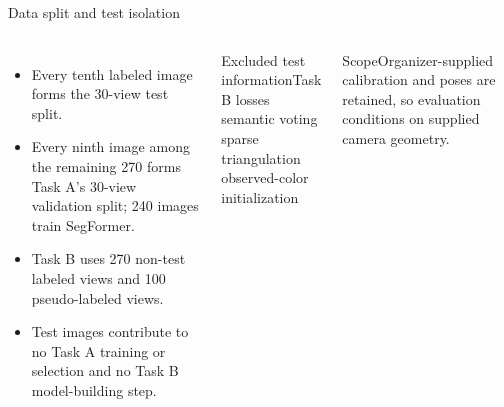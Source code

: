 \documentclass[aspectratio=169,10pt]{beamer}
\begin{document}
\begin{frame}{Data split and test isolation}
\begin{columns}[T,onlytextwidth]
\begin{itemize}\tightitems
\item Every tenth labeled image forms the 30-view test split.
\item Every ninth image among the remaining 270 forms Task A's 30-view validation split; 240 images train SegFormer.
\item Task B uses 270 non-test labeled views and 100 pseudo-labeled views.
\item Test images contribute to no Task A training or selection and no Task B model-building step.
\end{itemize}
\begin{block}{Excluded test information}Task B losses\\semantic voting\\sparse triangulation\\observed-color initialization\end{block}
\begin{alertblock}{Scope}Organizer-supplied calibration and poses are retained, so evaluation conditions on supplied camera geometry.\end{alertblock}
\end{columns}
\end{frame}
\end{document}
